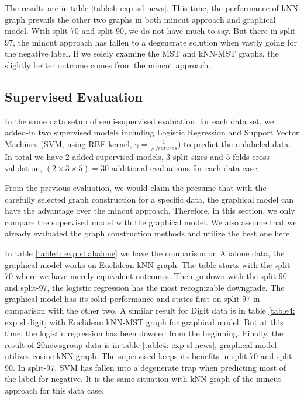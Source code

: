 The results are in table \ref{table4: exp ssl news}. This time, the performance of kNN graph prevails the other two graphs in both mincut approach and graphical model. With split-70 and split-90, we do not have much to say. But there in split-97, the mincut approach has fallen to a degenerate solution when vastly going for the negative label. If we solely examine the MST and kNN-MST graphs, the slightly better outcome comes from the mincut approach.  

\subsection{Supervised Evaluation}
\label{subsection: exp sl}

In the same data setup of semi-supervised evaluation, for each data set, we added-in two supervised models including Logistic Regression and Support Vector Machines (SVM, using RBF kernel, $\gamma=\frac{1}{\#features}$) to predict the unlabeled data. In total we have 2 added supervised models, 3 split sizes and 5-folds cross validation, $(2 \times 3 \times 5) = 30$ additional evaluations for each data case. 

From the previous evaluation, we would claim the presume that with the carefully selected graph construction for a specific data, the graphical model can have the advantage over the mincut approach. Therefore, in this section, we only compare the supervised model with the graphical model. We also assume that we already evaluated the graph construction methods and utilize the best one here. 

In table \ref{table4: exp sl abalone} we have the comparison on Abalone data, the graphical model works on Euclidean kNN graph. The table starts with the split-70 where we have merely equivalent outcomes. Then go down with the split-90 and split-97, the logistic regression has the most recognizable downgrade. The graphical model has its solid performance and states first on split-97 in comparison with the other two. A similar result for Digit data is in table \ref{table4: exp sl digit} with Euclidean kNN-MST graph for graphical model. But at this time, the logistic regression has been downed from the beginning. Finally, the result of 20newsgroup data is in table \ref{table4: exp sl news}, graphical model utilizes cosine kNN graph. The supervised keeps its benefits in split-70 and split-90. In split-97, SVM has fallen into a degenerate trap when predicting most of the label for negative. It is the same situation with kNN graph of the mincut approach for this data case.

\pagebreak











